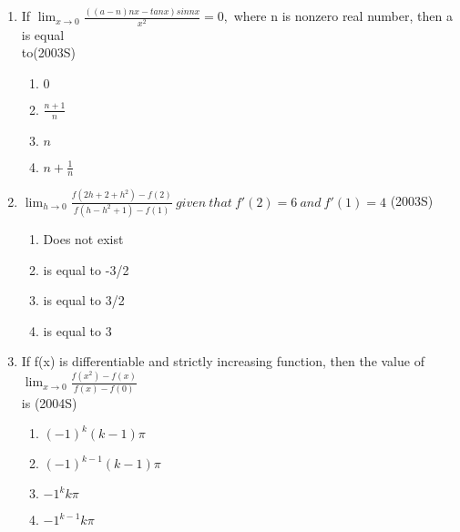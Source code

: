 \documentclass[journal,12pt,twocolumn]{IEEEtran}
\theoremstyle{remark}
\begin{document}
\begin{enumerate}[start=17]
\item %
{\begin{flushleft}
    If $\lim_{x \to 0} \frac{((a-n)nx-tanx)sinnx}{x^2} =0,$ where n is nonzero real number, then a is equal\\ to\hfill{(2003S)}
    \begin{enumerate}
     \item $0$
     \item $\frac{n+1}{n}$
     \item $n$
     \item $n+\frac{1}{n}$\\
    \end{enumerate}
\end{flushleft}}

\item %
{\begin{flushleft}
    $\lim_{h \to 0} \frac{f(2h+2+h^2)-f(2)}{f(h-h^2+1)-f(1)}\ given\ that\ f'(2)=6\ and\ f'(1)=4$ \hfill{(2003S)}
    \begin{enumerate}
     \item Does not exist
     \item is equal to -3/2
     \item is equal to 3/2
     \item is equal to 3\\
    \end{enumerate}
\end{flushleft}}

\item %
{\begin{flushleft}
If f(x) is differentiable and strictly increasing function, then the value of $\lim_{x \to 0} \frac{f(x^2)-f(x)}{f(x)-f(0)}$\\ is \hfill{(2004S)}
    \begin{enumerate}
     \item $(-1)^k (k-1) \pi$
     \item $(-1)^{k-1} (k-1) \pi$
     \item $-1^k k\pi$
     \item $-1^{k-1} k\pi$\\
    \end{enumerate}
\end{flushleft}}


\end{enumerate}
\end{document}
